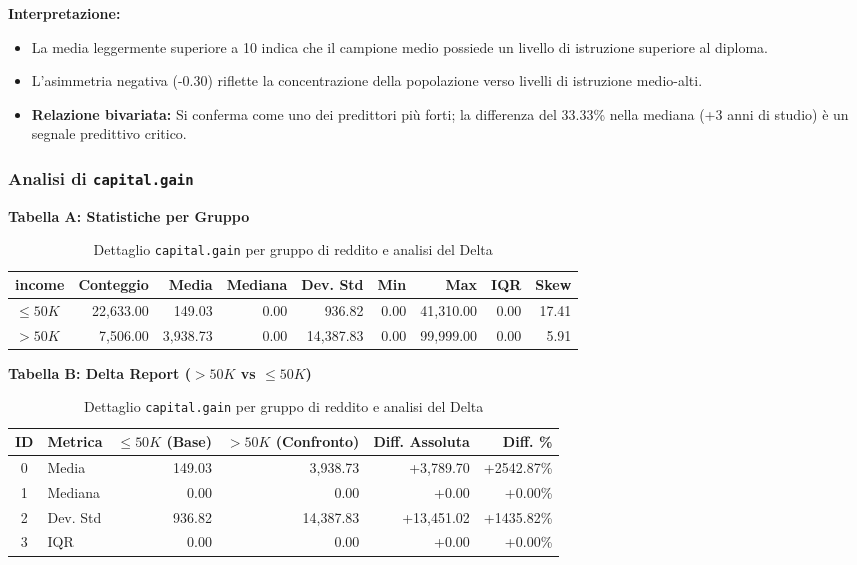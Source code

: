 \noindent
\textbf{Interpretazione:}
\begin{itemize}
    \item La media leggermente superiore a 10 indica che il campione medio possiede un livello di istruzione superiore al diploma.
    \item L'asimmetria negativa (-0.30) riflette la concentrazione della popolazione verso livelli di istruzione medio-alti.
    \item \textbf{Relazione bivariata:} Si conferma come uno dei predittori più forti; la differenza del 33.33\% nella mediana (+3 anni di studio) è un segnale predittivo critico.
\end{itemize}

\newpage
\subsubsection{Analisi di \texttt{capital.gain}}

\begin{table}[H]
    \centering
    \footnotesize
    \caption{Dettaglio \texttt{capital.gain} per gruppo di reddito e analisi del Delta}
    
    \textbf{Tabella A: Statistiche per Gruppo} \\
    \begin{tabular}{lrrrrrrrr}
        \toprule
        \textbf{income} & \textbf{Conteggio} & \textbf{Media} & \textbf{Mediana} & \textbf{Dev. Std} & \textbf{Min} & \textbf{Max} & \textbf{IQR} & \textbf{Skew} \\
        \midrule
        $\leq 50K$ & 22,633.00 & 149.03 & 0.00 & 936.82 & 0.00 & 41,310.00 & 0.00 & 17.41 \\
        $> 50K$ & 7,506.00 & 3,938.73 & 0.00 & 14,387.83 & 0.00 & 99,999.00 & 0.00 & 5.91 \\
        \bottomrule
    \end{tabular}

    \vspace{0.4cm}
    
    \textbf{Tabella B: Delta Report ($>50K$ vs $\leq 50K$)} \\
    \begin{tabular}{clrrrr}
        \toprule
        \textbf{ID} & \textbf{Metrica} & \textbf{$\leq 50K$ (Base)} & \textbf{$> 50K$ (Confronto)} & \textbf{Diff. Assoluta} & \textbf{Diff. \%} \\
        \midrule
        0 & Media & 149.03 & 3,938.73 & +3,789.70 & +2542.87\% \\
        1 & Mediana & 0.00 & 0.00 & +0.00 & +0.00\% \\
        2 & Dev. Std & 936.82 & 14,387.83 & +13,451.02 & +1435.82\% \\
        3 & IQR & 0.00 & 0.00 & +0.00 & +0.00\% \\
        \bottomrule
    \end{tabular}
\end{table}

